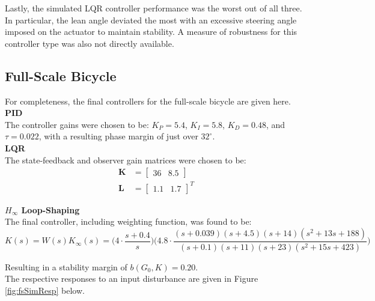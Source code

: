 Lastly, the simulated LQR controller performance was the worst out of all three. In particular, the lean angle deviated the most with an excessive steering angle imposed on the actuator to maintain stability. A measure of robustness for this controller type was also not directly available.

\subsection{Full-Scale Bicycle}
For completeness, the final controllers for the full-scale bicycle are given here. \\

\textbf{PID} \\
The controller gains were chosen to be: $K_P=5.4$, $K_I=5.8$, $K_D=0.48$, and $\tau=0.022$, with a resulting phase margin of just over $32^{\circ}$. \\

\newpage
\textbf{LQR} \\
The state-feedback and observer gain matrices were chosen to be:
\begin{align*}
\mathbf{K} &= \begin{bmatrix}
36 & 8.5
\end{bmatrix} \\
\mathbf{L} &= \begin{bmatrix}
1.1 & 1.7
\end{bmatrix}^T
\end{align*}

\textbf{$H_{\infty}$ Loop-Shaping} \\
The final controller, including weighting function, was found to be:
\begin{equation*}
K(s) = W(s) K_{\infty}(s) = \Big( 4 \cdot \frac{s+0.4}{s} \Big) \Big(4.8 \cdot \frac{(s+0.039)(s+4.5)(s+14)(s^2+13s+188)}{(s+0.1)(s+11)(s+23)(s^2+15s+423)} \Big)
\end{equation*}

Resulting in a stability margin of $b(G_0,K)=0.20$. \\

The respective responses to an input disturbance are given in Figure \ref{fig:fsSimResp} below.

